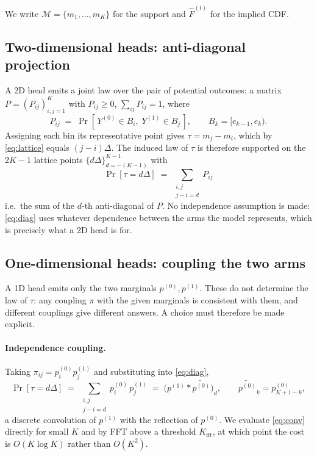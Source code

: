 We write $\mathcal{M} = \{m_1,\dots,m_K\}$ for the support and
$\hat F^{(t)}$ for the implied CDF.

\subsection{Two-dimensional heads: anti-diagonal projection}
\label{app:joint}

A 2D head emits a joint law over the pair of potential outcomes: a matrix
$P = (P_{ij})_{i,j=1}^{K}$ with $P_{ij} \ge 0$, $\sum_{ij} P_{ij} = 1$, where
\begin{equation}
  P_{ij} \;=\; \Pr\!\left[\, Y^{(0)} \in B_i ,\; Y^{(1)} \in B_j \,\right],
  \qquad B_k = [e_{k-1}, e_k) .
\end{equation}
Assigning each bin its representative point gives $\tau = m_j - m_i$, which
by \eqref{eq:lattice} equals $(j-i)\Delta$. The induced law of $\tau$ is
therefore supported on the $2K-1$ lattice points $\{d\Delta\}_{d=-(K-1)}^{K-1}$
with
\begin{equation}
  \boxed{\;
  \Pr[\tau = d\Delta] \;=\; \sum_{\substack{i,j \\ j - i = d}} P_{ij}
  \;}
  \label{eq:diag}
\end{equation}
i.e.\ the sum of the $d$-th anti-diagonal of $P$. No independence assumption
is made: \eqref{eq:diag} uses whatever dependence between the arms the model
represents, which is precisely what a 2D head is for.

\subsection{One-dimensional heads: coupling the two arms}
\label{app:marginals}

A 1D head emits only the two marginals $p^{(0)}, p^{(1)}$. These do not
determine the law of $\tau$: any coupling $\pi$ with the given marginals is
consistent with them, and different couplings give different answers. A
choice must therefore be made explicit.

\paragraph{Independence coupling.}
Taking $\pi_{ij} = p^{(0)}_i p^{(1)}_j$ and substituting into
\eqref{eq:diag},
\begin{equation}
  \boxed{\;
  \Pr[\tau = d\Delta]
  \;=\; \sum_{\substack{i,j \\ j-i=d}} p^{(0)}_i\, p^{(1)}_j
  \;=\; \bigl(p^{(1)} * \widetilde{p^{(0)}}\bigr)_d ,
  \qquad \widetilde{p^{(0)}}_k = p^{(0)}_{K+1-k} ,
  \;}
  \label{eq:conv}
\end{equation}
a discrete convolution of $p^{(1)}$ with the reflection of $p^{(0)}$. We
evaluate \eqref{eq:conv} directly for small $K$ and by FFT above a threshold
$K_{\mathrm{fft}}$, at which point the cost is $O(K \log K)$ rather than
$O(K^2)$.


